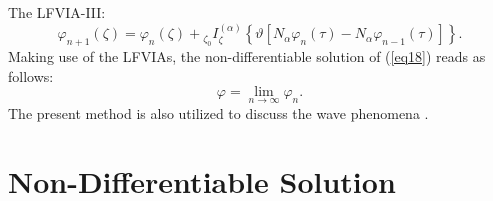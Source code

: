 \documentclass[10pt]{NSP1}
\begin{document}
The LFVIA-III:
\begin{equation}
\label{eq21}
\varphi _{n+1} \left( \zeta \right)=\varphi _n \left( \zeta \right)+{
}_{\zeta _0 }I_\zeta ^{\left( \alpha \right)}\left\{ {\vartheta \left[
{N_\alpha \varphi _n \left( \tau \right)-N_\alpha \varphi _{n-1} \left( \tau
\right)} \right]} \right\}.
\end{equation}
Making use of the LFVIAs, the non-differentiable solution of (\ref{eq18}) reads as
follows:
\begin{equation}
\label{eq22}
\varphi =\mathop {\lim }\limits_{n\to \infty } \varphi _n .
\end{equation}
The present method is also utilized to  discuss the wave phenomena \cite{44,45}.\\

\vskip 2mm

\section{\; Non-Differentiable Solution}
\end{document}
